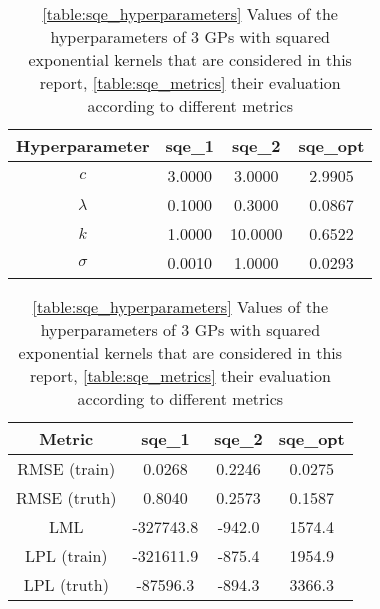 \begin{table}[b]
    \centering
    \begin{subtable}[t]{0.45\textwidth}
        \centering
        \begin{tabular}[t]{|c|c|c|c|}
            \hline
            Hyperparameter & sqe\_1 & sqe\_2 & sqe\_opt \\
            \hline
            $c$ & 3.0000 & 3.0000 & 2.9905 \\
            $\lambda$ & 0.1000 & 0.3000 & 0.0867 \\
            $k$ & 1.0000 & 10.0000 & 0.6522 \\
            $\sigma$ & 0.0010 & 1.0000 & 0.0293 \\
            \hline
        \end{tabular}
        \caption{}
        \label{table:sqe_hyperparameters}
    \end{subtable}
    \begin{subtable}[t]{0.45\textwidth}
        \centering
        \begin{tabular}[t]{|c|c|c|c|}
            \hline
            Metric & sqe\_1 & sqe\_2 & sqe\_opt \\
            \hline
            RMSE (train) & 0.0268 & 0.2246 & 0.0275 \\
            RMSE (truth) & 0.8040 & 0.2573 & 0.1587 \\
            LML & -327743.8 & -942.0 & 1574.4 \\
            LPL (train) & -321611.9 & -875.4 & 1954.9 \\
            LPL (truth) & -87596.3 & -894.3 & 3366.3 \\
            \hline
        \end{tabular}
        \caption{}
        \label{table:sqe_metrics}
    \end{subtable}
    \caption{\ref{table:sqe_hyperparameters} Values of the hyperparameters of 3 GPs with squared exponential kernels that are considered in this report, \ref{table:sqe_metrics} their evaluation according to different metrics}
    \label{table:sqe}
\end{table}
